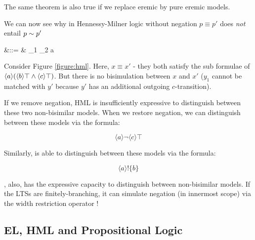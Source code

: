 \NI The same theorem is also true if we replace eremic by pure eremic
models.



We can now see why in Hennessy-Milner logic without negation $p \equiv
p'$ does \emph{not} entail $p \sim p'$

\begin{GRAMMAR}
  \phi 
    &\quad ::= \quad&
  \top \fOr \phi_1 \AND \phi_2  \fOr \langle a \rangle \phi
\end{GRAMMAR}



\NI Consider Figure \ref{figure:hml}.  Here, $x \equiv x'$ - they both
satisfy the sub formulae of $\langle a \rangle (\langle b \rangle \top
\land \langle c \rangle \top)$.  But there is no bisimulation between
$x$ and $x'$ ($y_1$ cannot be matched with $y'$ because $y'$ has an
additional outgoing $c$-transition).

If we remove negation, HML is insufficiently expressive to distinguish
between these two non-bisimilar models.  When we restore negation, we
can distinguish between these models via the formula:

\[
   \langle a \rangle \neg \langle c \rangle \top
\]

\NI Similarly, \ELABR{} is able to distinguish between these models via the
formula:

\[
  \langle a \rangle ! \{b\}
\]

\NI \ELABR{}, also, has the expressive capacity to distinguish between
non-bisimilar models. If the LTSs are finitely-branching, it can
simulate negation (in innermost scope) via the width restriction
operator !

\subsection{EL, HML and Propositional Logic}



